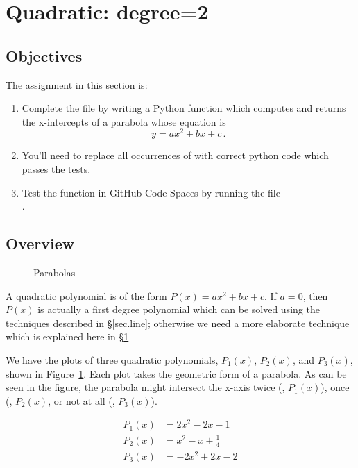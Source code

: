 \section{Quadratic: degree=2}
\label{sec.quadratic}

\subsection{Objectives}
The assignment in this section is:
\begin{enumerate}
\item Complete the file  by writing a Python
  function which computes and returns the x-intercepts of a parabola whose
  equation is \[y=a x^2 + b x + c\,.\]
\item    You'll need to replace all occurrences of 
  with correct python code which passes the tests.

\item Test the function in GitHub Code-Spaces by running the file\\
  .
\end{enumerate}

\subsection{Overview}

\begin{figure}
\centering

\caption{Parabolas}
\label{fig.parabola}
\end{figure}

A quadratic polynomial is of the form $P(x)=a x^2 + b x + c$.  If
$a=0$, then $P(x)$ is actually a first degree polynomial which can be
solved using the techniques described in \S\ref{sec.line};
otherwise we need a more elaborate technique which is explained here in
\S\ref{sec.quadratic}

We have the plots of three quadratic polynomials, $P_1(x)$, $P_2(x)$,
and $P_3(x)$, shown in Figure~\ref{fig.parabola}.  Each plot takes the
geometric form of a parabola.  As can be seen in the figure, the
parabola might intersect the x-axis twice (\eg, $P_1(x)$), once (\eg,
$P_2(x)$, or not at all (\eg, $P_3(x)$).

\begin{align*}
  P_1(x) &= 2x^2 - 2 x - 1\\
  P_2(x) &= x^2 -x + \frac{1}{4}\\
  P_3(x) &=  -2x^2 + 2x -2
\end{align*}


